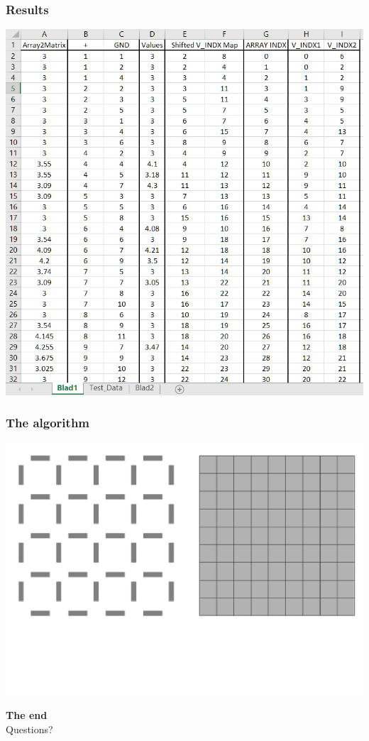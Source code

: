 \documentclass{beamer}
\begin{document}
\begin{frame}
    \frametitle{Results}
    \begin{center}
        \includegraphics[width=.8\textwidth]{img/VoltageToMatrixMap_withTestArray.PNG}
    \end{center}

\end{frame}

\begin{frame}
    \frametitle{The algorithm}
    \begin{center}
        \includegraphics[width=\textwidth]{img/grid0.png}
    \end{center}
\end{frame}

\begin{frame}
    \begin{center}
        \textbf{The end}\\
        Questions?
    \end{center}
\end{frame}
\end{document}
